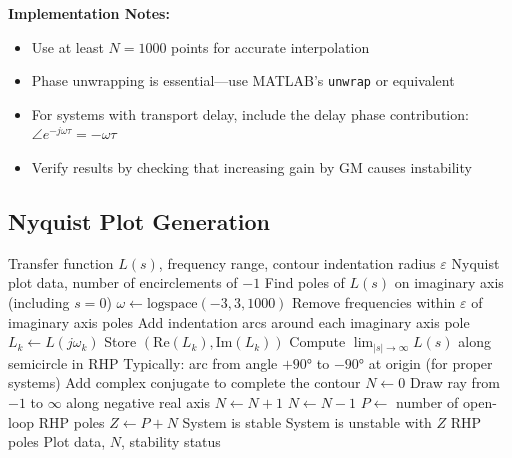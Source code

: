 \textbf{Implementation Notes:}
\begin{itemize}
    \item Use at least $N = 1000$ points for accurate interpolation
    \item Phase unwrapping is essential---use MATLAB's \texttt{unwrap} or equivalent
    \item For systems with transport delay, include the delay phase contribution: $\angle e^{-j\omega\tau} = -\omega\tau$
    \item Verify results by checking that increasing gain by GM causes instability
\end{itemize}

\subsection{Nyquist Plot Generation}

\begin{algorithm}[H]
\caption{Nyquist Plot with Encirclement Count}
\label{alg:nyquist}
\begin{algorithmic}[1]
\REQUIRE Transfer function $L(s)$, frequency range, contour indentation radius $\varepsilon$
\ENSURE Nyquist plot data, number of encirclements of $-1$
\STATE
\STATE {}
\STATE Find poles of $L(s)$ on imaginary axis (including $s = 0$)
\STATE
\STATE {}
\STATE $\omega \gets \text{logspace}(-3, 3, 1000)$ 
\STATE Remove frequencies within $\varepsilon$ of imaginary axis poles
\STATE Add indentation arcs around each imaginary axis pole
\STATE
{}
    \STATE $L_k \gets L(j\omega_k)$
    \STATE Store $(\text{Re}(L_k), \text{Im}(L_k))$
\ENDFOR
\STATE
\STATE {}
\STATE Compute $\lim_{|s|\to\infty} L(s)$ along semicircle in RHP
\STATE Typically: arc from angle $+90°$ to $-90°$ at origin (for proper systems)
\STATE
\STATE {}
    \STATE Add complex conjugate to complete the contour
\ENDFOR
\STATE
\STATE {}
\STATE $N \gets 0$
\STATE Draw ray from $-1$ to $\infty$ along negative real axis
            \STATE $N \gets N + 1$
        \ELSE
            \STATE $N \gets N - 1$
        \ENDIF
    \ENDIF
\ENDFOR
\STATE
\STATE {}
\STATE $P \gets$ number of open-loop RHP poles
\STATE $Z \gets P + N$ 
    \STATE System is stable
\ELSE
    \STATE System is unstable with $Z$ RHP poles
\ENDIF
\STATE
\RETURN Plot data, $N$, stability status
\end{algorithmic}
\end{algorithm}

